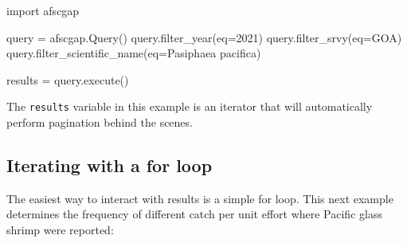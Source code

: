 \documentclass[
  letterpaper,
  oneside,
  open=any]{scrbook}
\newenvironment{Shaded}{\begin{snugshade}}{\end{snugshade}}
\newcommand{\AttributeTok}[1]{\textcolor[rgb]{0.40,0.45,0.13}{#1}}
\newcommand{\DecValTok}[1]{\textcolor[rgb]{0.68,0.00,0.00}{#1}}
\newcommand{\FunctionTok}[1]{\textcolor[rgb]{0.28,0.35,0.67}{#1}}
\newcommand{\NormalTok}[1]{\textcolor[rgb]{0.00,0.23,0.31}{#1}}
\newcommand{\OtherTok}[1]{\textcolor[rgb]{0.00,0.23,0.31}{#1}}
\newcommand{\StringTok}[1]{\textcolor[rgb]{0.13,0.47,0.30}{#1}}
\begin{document}
\begin{Shaded}
\begin{Highlighting}[]
\NormalTok{import afscgap}

\NormalTok{query }\OtherTok{=} \FunctionTok{afscgap.Query}\NormalTok{()}
\FunctionTok{query.filter\_year}\NormalTok{(}\AttributeTok{eq=}\DecValTok{2021}\NormalTok{)}
\FunctionTok{query.filter\_srvy}\NormalTok{(}\AttributeTok{eq=}\StringTok{\textquotesingle{}GOA\textquotesingle{}}\NormalTok{)}
\FunctionTok{query.filter\_scientific\_name}\NormalTok{(}\AttributeTok{eq=}\StringTok{\textquotesingle{}Pasiphaea pacifica\textquotesingle{}}\NormalTok{)}

\NormalTok{results }\OtherTok{=} \FunctionTok{query.execute}\NormalTok{()}
\end{Highlighting}
\end{Shaded}

The \texttt{results} variable in this example is an iterator that will
automatically perform pagination behind the scenes.

\hypertarget{iterating-with-a-for-loop}{%
\subsection{Iterating with a for loop}\label{iterating-with-a-for-loop}}

The easiest way to interact with results is a simple for loop. This next
example determines the frequency of different catch per unit effort
where Pacific glass shrimp were reported:
\end{document}

